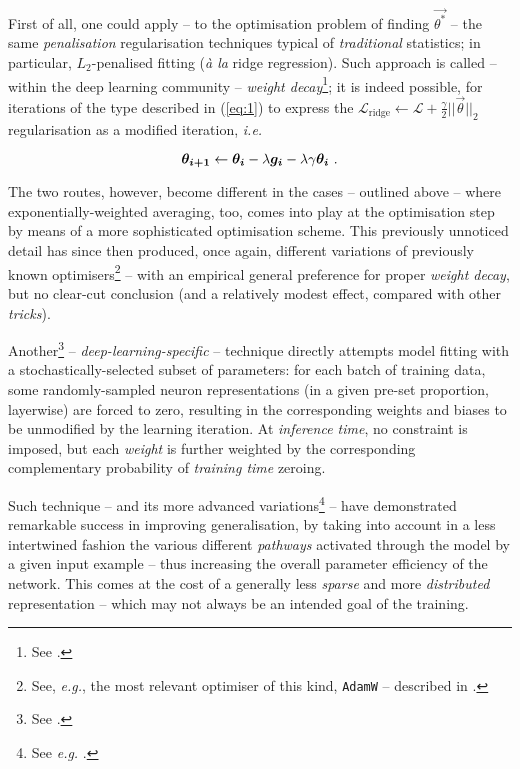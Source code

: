 First of all, one could apply -- to the optimisation problem of finding $\vec{\theta^*}$ -- the same \textit{penalisation} regularisation techniques typical of \textit{traditional} statistics; in particular, $L_2$-penalised fitting (\textit{à la} ridge regression). Such approach is called -- within the deep learning community -- \textit{weight decay}\footnote{See \cite{KroghPalmer1991WeightDecay}.}; it is indeed possible, for iterations of the type described in (\ref{eq:1}) to express the $\mathcal{L}_{\text{ridge}} \leftarrow \mathcal{L} + \frac{\gamma}{2}||\vec{\theta}||_2$ regularisation as a modified iteration, \textit{i.e.}

$$\bm{\theta_{i+1}} \leftarrow  \bm{\theta_{i}} - \lambda\bm{g_i} - \lambda\gamma\bm{\theta_i}\text{ .}$$

The two routes, however, become different in the cases -- outlined above -- where exponentially-weighted averaging, too, comes into play at the optimisation step by means of a more sophisticated optimisation scheme. This previously unnoticed detail has since then produced, once again, different variations of previously known optimisers\footnote{See, \textit{e.g.}, the most relevant optimiser of this kind, \texttt{AdamW} -- described in \cite{LoshchilovHutter2018AdamW}.} -- with an empirical general preference for proper \textit{weight decay}, but no clear-cut conclusion (and a relatively modest effect, compared with other \textit{tricks}).

Another\footnote{See \cite{SirvastavaEtAl2014Dropout}.} -- \textit{deep-learning-specific} -- technique directly attempts model fitting with a stochastically-selected subset of parameters: for each batch of training data, some randomly-sampled neuron representations (in a given pre-set proportion, layerwise) are forced to zero, resulting in the corresponding weights and biases to be unmodified by the learning iteration. At \textit{inference time}, no constraint is imposed, but each \textit{weight} is further weighted by the corresponding complementary probability of \textit{training time} zeroing.

Such technique -- and its more advanced variations\footnote{See \textit{e.g.} \cite{BolukiEtAl2020BernoulliDropout}.} -- have demonstrated remarkable success in improving generalisation, by taking into account in a less intertwined fashion the various different \textit{pathways} activated through the model by a given input example -- thus increasing the overall parameter efficiency of the network. This comes at the cost of a generally less \textit{sparse} and more \textit{distributed} representation -- which may not always be an intended goal of the training.

